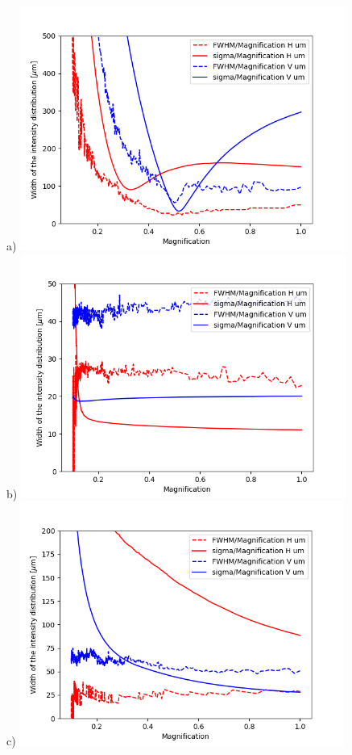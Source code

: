\documentclass{iucr}              %
\begin{document}
\begin{figure}[h]
\flushleft
\centering
a)
\includegraphics[width=0.95\textwidth]{figures/scan_toroid.png}\\
b)
\includegraphics[width=0.95\textwidth]{figures/scan_diaboloid.png}\\
c)
\includegraphics[width=0.95\textwidth]{figures/scan_parabolic-cone.png}


\end{figure}
\end{document}
